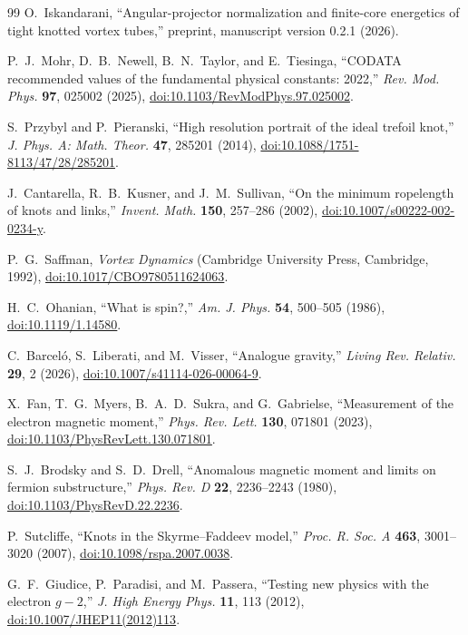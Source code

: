 \documentclass[aps,pre,preprint,notitlepage,nofootinbib,superscriptaddress]{revtex4-2}
\begin{document}
\begin{thebibliography}{99}
O.~Iskandarani,
``Angular-projector normalization and finite-core energetics of tight knotted vortex tubes,''
preprint, manuscript version 0.2.1 (2026).

P.~J.~Mohr, D.~B.~Newell, B.~N.~Taylor, and E.~Tiesinga,
``CODATA recommended values of the fundamental physical constants: 2022,''
\emph{Rev. Mod. Phys.} \textbf{97}, 025002 (2025),
\href{https://doi.org/10.1103/RevModPhys.97.025002}{doi:10.1103/RevModPhys.97.025002}.

S.~Przybyl and P.~Pieranski,
``High resolution portrait of the ideal trefoil knot,''
\emph{J. Phys. A: Math. Theor.} \textbf{47}, 285201 (2014),
\href{https://doi.org/10.1088/1751-8113/47/28/285201}{doi:10.1088/1751-8113/47/28/285201}.

J.~Cantarella, R.~B.~Kusner, and J.~M.~Sullivan,
``On the minimum ropelength of knots and links,''
\emph{Invent. Math.} \textbf{150}, 257--286 (2002),
\href{https://doi.org/10.1007/s00222-002-0234-y}{doi:10.1007/s00222-002-0234-y}.

P.~G.~Saffman,
\emph{Vortex Dynamics}
(Cambridge University Press, Cambridge, 1992),
\href{https://doi.org/10.1017/CBO9780511624063}{doi:10.1017/CBO9780511624063}.

H.~C.~Ohanian,
``What is spin?,''
\emph{Am. J. Phys.} \textbf{54}, 500--505 (1986),
\href{https://doi.org/10.1119/1.14580}{doi:10.1119/1.14580}.

C.~Barcel\'o, S.~Liberati, and M.~Visser,
``Analogue gravity,''
\emph{Living Rev. Relativ.} \textbf{29}, 2 (2026),
\href{https://doi.org/10.1007/s41114-026-00064-9}{doi:10.1007/s41114-026-00064-9}.

X.~Fan, T.~G.~Myers, B.~A.~D.~Sukra, and G.~Gabrielse,
``Measurement of the electron magnetic moment,''
\emph{Phys. Rev. Lett.} \textbf{130}, 071801 (2023),
\href{https://doi.org/10.1103/PhysRevLett.130.071801}{doi:10.1103/PhysRevLett.130.071801}.

S.~J.~Brodsky and S.~D.~Drell,
``Anomalous magnetic moment and limits on fermion substructure,''
\emph{Phys. Rev. D} \textbf{22}, 2236--2243 (1980),
\href{https://doi.org/10.1103/PhysRevD.22.2236}{doi:10.1103/PhysRevD.22.2236}.

P.~Sutcliffe,
``Knots in the Skyrme--Faddeev model,''
\emph{Proc. R. Soc. A} \textbf{463}, 3001--3020 (2007),
\href{https://doi.org/10.1098/rspa.2007.0038}{doi:10.1098/rspa.2007.0038}.


G.~F.~Giudice, P.~Paradisi, and M.~Passera,
``Testing new physics with the electron \(g-2\),''
\emph{J. High Energy Phys.} \textbf{11}, 113 (2012),
\href{https://doi.org/10.1007/JHEP11(2012)113}{doi:10.1007/JHEP11(2012)113}.

\end{thebibliography}
\end{document}

